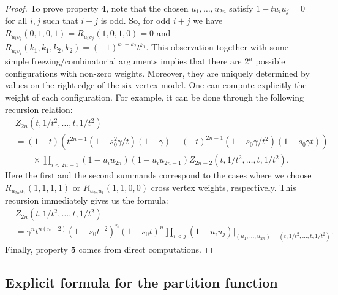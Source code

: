\documentclass[11pt]{article}
\theoremstyle{definition}
\begin{document}
\begin{proof}
	To prove property \textbf{4}, note that the chosen $u_1, \dots, u_{2n}$ satisfy 
	$
	1 - t u_i u_j = 0
	$ for all $i, j$ such that $i+j$  is odd. So, for odd $i+j$ we have $R_{u_i v_j}(0,1,0,1) = R_{u_i v_j}(1,0,1,0) = 0$ and $R_{u_i v_j}(k_1,k_1,k_2,k_2) = (-1)^{k_1 + k_2} t^{k_1}$.
	This observation together with some simple freezing/combinatorial arguments implies that there are $2^{n}$ possible configurations with non-zero weights. Moreover, they are uniquely determined by values on the right edge of the six vertex model. One can compute explicitly the weight of each configuration. For example, it can be done through the following recursion relation:
	\begin{equation*}
	\begin{split}
	&Z_{2n}(t,  1 / t^2, \dots, t,   1 / t^2)
	\\
	&=(1 - t) (t^{2n-1} (1 - s_{0}^2 \gamma/t)(1 - \gamma) + (-t)^{2n-1}(1 - s_0 \gamma/ t^{2})(1 - s_0 \gamma t))  
	\\&\qquad\times\prod_{i<2n-1} (1 - u_i u_{2n}) (1 - u_i u_{2n-1})
	Z_{2n-2} (t,  1 / t^2, \dots, t,   1 / t^2).
	\end{split}
	\end{equation*}
	Here the first and the second summands correspond to the cases where we choose $R_{u_{2n} u_{1}}(1, 1, 1, 1)$ or $R_{u_{2n} u_{1}}(1, 1, 0, 0)$ cross vertex weights, respectively. 
	This recursion immediately gives us the formula:
	\begin{equation*}
	\begin{split}
	&
	Z_{2n}(t,  1 / t^2, \dots, t,   1 / t^2) \\&
	=  \gamma^{n} t^{n(n-2)} (1 - s_{0} t^{-2})^n (1 -s_{0} t)^{n}\prod_{i<j} (1 - u_i u_j)|_{(u_1, ... , u_{2n}) = (t,  1 / t^2, \dots, t,   1 / t^2)}.
	\end{split}
	\end{equation*}
	Finally, property {\bf 5} comes from direct computations.
\end{proof}

\subsection{Explicit formula for the partition function}
\end{document}
